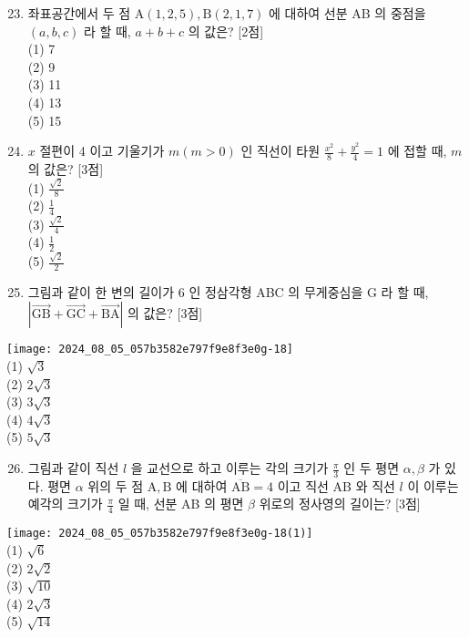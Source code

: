 \documentclass[10pt]{article}
\begin{document}
\begin{enumerate}
  \setcounter{enumi}{22}
  \item 좌표공간에서 두 점 \(\mathrm{A}(1,2,5), \mathrm{B}(2,1,7)\) 에 대하여 선분 AB 의 중점을 \((a, b, c)\) 라 할 때, \(a+b+c\) 의 값은? [2점]\\
(1) 7\\
(2) 9\\
(3) 11\\
(4) 13\\
(5) 15

  \item \(x\) 절편이 4 이고 기울기가 \(m(m>0)\) 인 직선이 타원 \(\frac{x^{2}}{8}+\frac{y^{2}}{4}=1\) 에 접할 때, \(m\) 의 값은? [3점]\\
(1) \(\frac{\sqrt{2}}{8}\)\\
(2) \(\frac{1}{4}\)\\
(3) \(\frac{\sqrt{2}}{4}\)\\
(4) \(\frac{1}{2}\)\\
(5) \(\frac{\sqrt{2}}{2}\)

  \item 그림과 같이 한 변의 길이가 6 인 정삼각형 ABC 의 무게중심을 G 라 할 때, \(|\overrightarrow{\mathrm{GB}}+\overrightarrow{\mathrm{GC}}+\overrightarrow{\mathrm{BA}}|\) 의 값은? [3점]

\end{enumerate}

\texttt{[image: 2024\_08\_05\_057b3582e797f9e8f3e0g-18]}\\
(1) \(\sqrt{3}\)\\
(2) \(2 \sqrt{3}\)\\
(3) \(3 \sqrt{3}\)\\
(4) \(4 \sqrt{3}\)\\
(5) \(5 \sqrt{3}\)

\begin{enumerate}
  \setcounter{enumi}{25}
  \item 그림과 같이 직선 \(l\) 을 교선으로 하고 이루는 각의 크기가 \(\frac{\pi}{3}\) 인 두 평면 \(\alpha, \beta\) 가 있다. 평면 \(\alpha\) 위의 두 점 \(\mathrm{A}, \mathrm{B}\) 에 대하여 \(\overline{\mathrm{AB}}=4\) 이고 직선 AB 와 직선 \(l\) 이 이루는 예각의 크기가 \(\frac{\pi}{4}\) 일 때, 선분 AB 의 평면 \(\beta\) 위로의 정사영의 길이는? [3점]
\end{enumerate}

\texttt{[image: 2024\_08\_05\_057b3582e797f9e8f3e0g-18(1)]}\\
(1) \(\sqrt{6}\)\\
(2) \(2 \sqrt{2}\)\\
(3) \(\sqrt{10}\)\\
(4) \(2 \sqrt{3}\)\\
(5) \(\sqrt{14}\)
\end{document}
